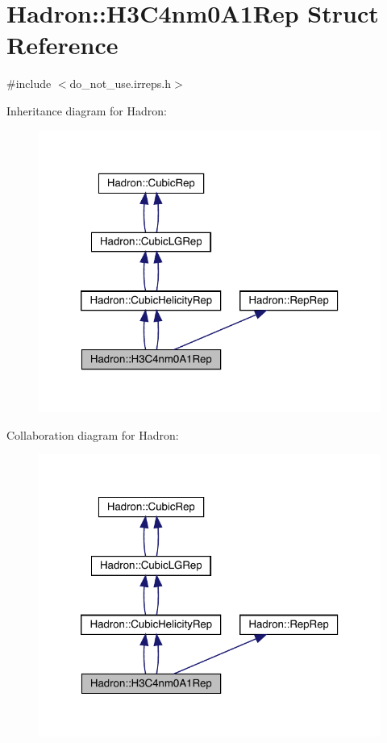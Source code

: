 \hypertarget{structHadron_1_1H3C4nm0A1Rep}{}\section{Hadron\+:\+:H3\+C4nm0\+A1\+Rep Struct Reference}
\label{structHadron_1_1H3C4nm0A1Rep}


{\ttfamily \#include $<$do\+\_\+not\+\_\+use.\+irreps.\+h$>$}



Inheritance diagram for Hadron\+:\nopagebreak
\begin{figure}[H]
\begin{center}
\leavevmode
\includegraphics[width=320pt]{d6/d30/structHadron_1_1H3C4nm0A1Rep__inherit__graph}
\end{center}
\end{figure}


Collaboration diagram for Hadron\+:\nopagebreak
\begin{figure}[H]
\begin{center}
\leavevmode
\includegraphics[width=320pt]{d4/d9b/structHadron_1_1H3C4nm0A1Rep__coll__graph}
\end{center}
\end{figure}
